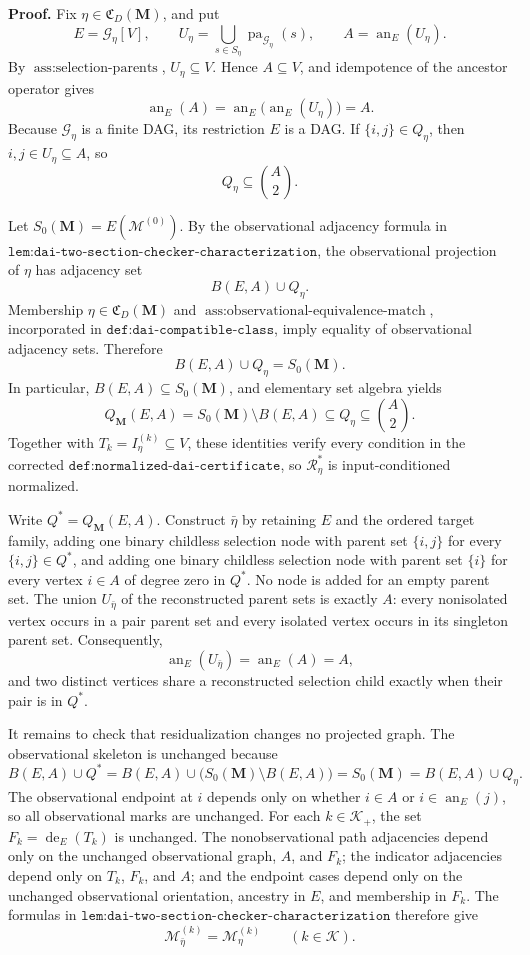 \textbf{Proof.}
Fix \(\eta\in\mathfrak C_D(\mathbf M)\), and put
\[
E=\mathcal G_\eta[V],
\qquad
U_\eta=\bigcup_{s\in S_\eta}\operatorname{pa}_{\mathcal G_\eta}(s),
\qquad
A=\operatorname{an}_E(U_\eta).
\]
By \(\operatorname{ass{:}selection\text{-}parents}\), \(U_\eta\subseteq V\).  Hence \(A\subseteq V\), and idempotence of the ancestor operator gives
\[
\operatorname{an}_E(A)
=\operatorname{an}_E\!\bigl(\operatorname{an}_E(U_\eta)\bigr)
=A.
\]
Because \(\mathcal G_\eta\) is a finite DAG, its restriction \(E\) is a DAG.  If \(\{i,j\}\in Q_\eta\), then \(i,j\in U_\eta\subseteq A\), so
\[
Q_\eta\subseteq\binom A2.
\]

Let \(S_0(\mathbf M)=E(\mathcal M^{(0)})\).  By the observational adjacency formula in \(\texttt{lem:dai-two-section-checker-characterization}\), the observational projection of \(\eta\) has adjacency set
\[
B(E,A)\cup Q_\eta.
\]
Membership \(\eta\in\mathfrak C_D(\mathbf M)\) and \(\operatorname{ass{:}observational\text{-}equivalence\text{-}match}\), incorporated in \(\texttt{def:dai-compatible-class}\), imply equality of observational adjacency sets.  Therefore
\[
B(E,A)\cup Q_\eta=S_0(\mathbf M).
\]
In particular, \(B(E,A)\subseteq S_0(\mathbf M)\), and elementary set algebra yields
\[
Q_{\mathbf M}(E,A)
=S_0(\mathbf M)\setminus B(E,A)
\subseteq Q_\eta
\subseteq\binom A2.
\]
Together with \(T_k=I_\eta^{(k)}\subseteq V\), these identities verify every condition in the corrected \(\texttt{def:normalized-dai-certificate}\), so \(\mathcal R_\eta^*\) is input-conditioned normalized.

Write \(Q^*=Q_{\mathbf M}(E,A)\).  Construct \(\bar\eta\) by retaining \(E\) and the ordered target family, adding one binary childless selection node with parent set \(\{i,j\}\) for every \(\{i,j\}\in Q^*\), and adding one binary childless selection node with parent set \(\{i\}\) for every vertex \(i\in A\) of degree zero in \(Q^*\).  No node is added for an empty parent set.  The union \(U_{\bar\eta}\) of the reconstructed parent sets is exactly \(A\): every nonisolated vertex occurs in a pair parent set and every isolated vertex occurs in its singleton parent set.  Consequently,
\[
\operatorname{an}_E(U_{\bar\eta})
=\operatorname{an}_E(A)=A,
\]
and two distinct vertices share a reconstructed selection child exactly when their pair is in \(Q^*\).

It remains to check that residualization changes no projected graph.  The observational skeleton is unchanged because
\[
B(E,A)\cup Q^*
=B(E,A)\cup\bigl(S_0(\mathbf M)\setminus B(E,A)\bigr)
=S_0(\mathbf M)
=B(E,A)\cup Q_\eta.
\]
The observational endpoint at \(i\) depends only on whether \(i\in A\) or \(i\in\operatorname{an}_E(j)\), so all observational marks are unchanged.  For each \(k\in\mathcal K_+\), the set \(F_k=\operatorname{de}_E(T_k)\) is unchanged.  The nonobservational path adjacencies depend only on the unchanged observational graph, \(A\), and \(F_k\); the indicator adjacencies depend only on \(T_k\), \(F_k\), and \(A\); and the endpoint cases depend only on the unchanged observational orientation, ancestry in \(E\), and membership in \(F_k\).  The formulas in \(\texttt{lem:dai-two-section-checker-characterization}\) therefore give
\[
\mathcal M_{\bar\eta}^{(k)}=\mathcal M_\eta^{(k)}
\qquad(k\in\mathcal K).
\]

